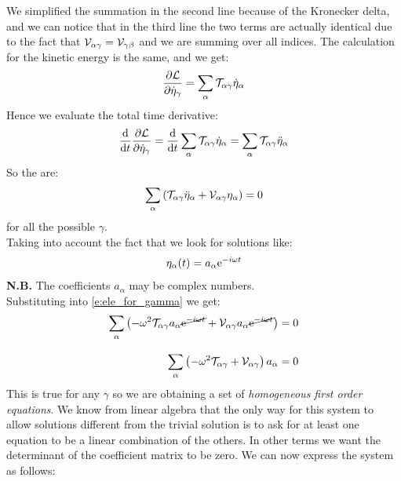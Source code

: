 We simplified the summation in the second line because of the Kronecker delta, and we can notice that in the third line the two terms are actually identical due to the fact that $\mathcal{V}_{\alpha \gamma} = \mathcal{V}_{\gamma \beta}$ and we are summing over all indices. The calculation for the kinetic energy is the same, and we get:
\begin{equation}
    \pdv{\lagr}{\dot{\eta}_{\gamma}} = \bigsum_{\alpha}\Telegant_{\alpha \gamma} \dot{\eta}_{\alpha}
\end{equation}
Hence we evaluate the total time derivative:
\begin{equation}
    \dv{}{t}\pdv{\lagr}{\dot{\eta}_{\gamma}} = \dv{}{t}\bigsum_{\alpha}\Telegant_{\alpha \gamma} \dot{\eta}_{\alpha} = \bigsum_{\alpha}\Telegant_{\alpha \gamma} \ddot{\eta}_{\alpha}
\end{equation}
So the \eleref\;are:
\begin{equation} \label{e:ele_for_gamma}
    \displaystyle\sum_{\alpha}\left(\mathcal{T}_{\alpha \gamma} \ddot{\eta}_{\alpha} + \mathcal{V}_{\alpha \gamma} \eta_{\alpha}\right) = 0
\end{equation}
for all the possible $\gamma$.\\
Taking into account the fact that we look for solutions like:
\begin{equation}
    \eta_{\alpha} (t) = a_{\alpha}\mathrm{e}^{-i\omega t}
\end{equation}
\textbf{N.B.} The coefficients $a_{\alpha}$ may be complex numbers.\\
Substituting into \eqref{e:ele_for_gamma} we get:
\begin{equation} \label{e:eigenvalue_alpha}
    \begin{split}
        \displaystyle\sum_{\alpha}\left(-\omega^2\mathcal{T}_{\alpha \gamma} a_{\alpha}\cancel{\mathrm{e}^{-i\omega t}} + \mathcal{V}_{\alpha \gamma}a_{\alpha}\cancel{\mathrm{e}^{-i\omega t}}\right) &= 0\\[8pt]
        \displaystyle\sum_{\alpha}\left(-\omega^2\mathcal{T}_{\alpha \gamma} + \mathcal{V}_{\alpha \gamma}\right)a_{\alpha} &= 0
    \end{split}
\end{equation}
This is true for any $\gamma$ so we are obtaining a set of \textit{homogeneous first order equations}. We know from linear algebra that the only way for this system to allow solutions different from the trivial solution is to ask for at least one equation to be a linear combination of the others.
In other terms we want the determinant of the coefficient matrix to be zero. We can now express the system as follows:
